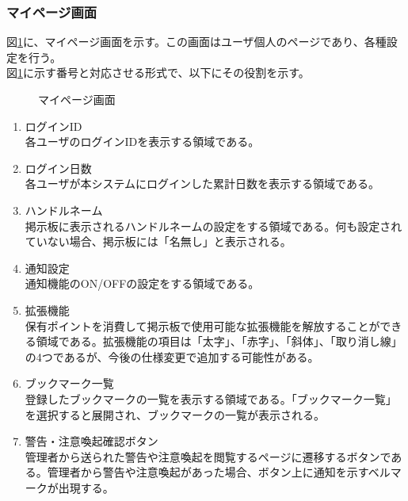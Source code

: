 \documentclass[a4j]{jarticle}
\begin{document}
\subsubsection{マイページ画面}
図\ref{fig:mypage}に、マイページ画面を示す。この画面はユーザ個人のページであり、各種設定を行う。\\
図\ref{fig:mypage}に示す番号と対応させる形式で、以下にその役割を示す。

\begin{figure}[H]
\centering
{}
\caption{マイページ画面}
\label{fig:mypage}
\end{figure}

\begin{enumerate}
  \renewcommand{\labelenumi}{\textcircled{\scriptsize \theenumi}}

  \item ログインID\\
  各ユーザのログインIDを表示する領域である。
  \item ログイン日数\\
  各ユーザが本システムにログインした累計日数を表示する領域である。
  \item ハンドルネーム\\
  掲示板に表示されるハンドルネームの設定をする領域である。何も設定されていない場合、掲示板には「名無し」と表示される。
  \item 通知設定\\
  通知機能のON/OFFの設定をする領域である。
  \item 拡張機能\\
  保有ポイントを消費して掲示板で使用可能な拡張機能を解放することができる領域である。拡張機能の項目は「太字」、「赤字」、「斜体」、「取り消し線」の4つであるが、今後の仕様変更で追加する可能性がある。
  \item ブックマーク一覧\\
  登録したブックマークの一覧を表示する領域である。「ブックマーク一覧」を選択すると展開され、ブックマークの一覧が表示される。
  \item 警告・注意喚起確認ボタン\\
  管理者から送られた警告や注意喚起を閲覧するページに遷移するボタンである。管理者から警告や注意喚起があった場合、ボタン上に通知を示すベルマークが出現する。
\end{enumerate}
\end{document}
